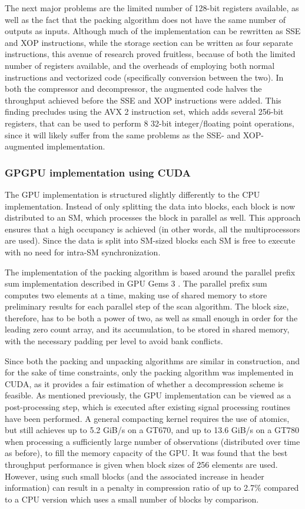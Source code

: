   The next major problems are the limited number of 128-bit registers available, as well as the fact that the packing algorithm does not have the same number of outputs as inputs. Although
  much of the implementation can be rewritten as SSE and XOP instructions, while the storage section can be written as four separate instructions, this avenue of research
  proved fruitless, because of both the limited number of registers available, and the overheads of employing both normal instructions and vectorized code (specifically conversion
  between the two). In both the compressor and decompressor, the augmented code halves the throughput achieved before the SSE and XOP instructions were added. This finding precludes
  using the AVX 2 instruction set, which adds several 256-bit registers, that can be used to perform 8 32-bit integer/floating point operations, since it will likely suffer from
  the same problems as the SSE- and XOP-augmented implementation.
  \subsubsection{GPGPU implementation using CUDA}
  The GPU implementation is structured slightly differently to the CPU implementation. Instead of only splitting the data into blocks, each block is now distributed to
  an SM, which processes the block in parallel as well. This approach ensures that a high occupancy is achieved (in other words, all the multiprocessors are used). Since the data is
  split into SM-sized blocks each SM is free to execute with no need for intra-SM synchronization. 
  
  The implementation of the packing algorithm is based around the parallel prefix sum implementation described in GPU Gems 3 \cite{harris2007parallel}. The parallel prefix sum computes two 
  elements at a time, making use of shared memory to store preliminary results for each parallel step of the scan algorithm. The block size, therefore, has to be both a power of 
  two, as well as small enough in order for the leading zero count array, and its accumulation, to be stored in shared memory, with the necessary padding per level to avoid bank conflicts.
  
  Since both the packing and unpacking algorithms are similar in construction, and for the sake of time constraints, only the packing algorithm was implemented in CUDA, as it 
  provides a fair estimation of whether a decompression scheme is feasible. As mentioned previously, the GPU implementation can be viewed as a post-processing step, which is executed after 
  existing signal processing routines have been performed. A general compacting kernel requires the use of atomics, but still achieves up to 5.2 GiB/s on a GT670, and up to 13.6 GiB/s on a 
  GT780 when processing a sufficiently large number of observations (distributed over time as before), to fill the memory capacity of the GPU. It was found that the best throughput performance 
  is given when block sizes of 256 elements are used. However, using such small blocks (and the associated increase in header information) can result in a penalty in compression 
  ratio of up to 2.7\% compared to a CPU version which uses a small number of blocks by comparison.
  

